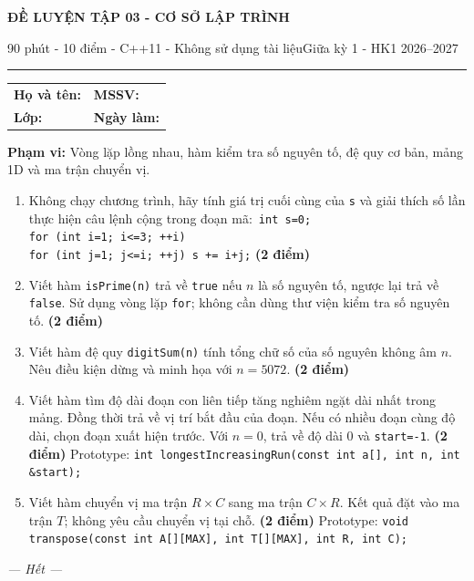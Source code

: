 \documentclass[11pt,a4paper]{article}
\newcommand{\examtitle}[4]{\begin{center}{\Large\bfseries\color{hcmusblue}#1}\par\vspace{3pt}{\large\bfseries #2}\par\vspace{3pt}\small #3\quad\textbullet\quad #4\end{center}\vspace{5pt}\hrule\vspace{8pt}}
\newcommand{\studentline}{\begin{tabularx}{\textwidth}{X X}\textbf{Họ và tên:} \hrulefill & \textbf{MSSV:} \hrulefill\\[7pt]\textbf{Lớp:} \hrulefill & \textbf{Ngày làm:} \hrulefill\end{tabularx}\vspace{8pt}}
\newcommand{\points}[1]{\hfill\textbf{(#1 điểm)}}
\begin{document}
\examtitle{ĐỀ LUYỆN TẬP 03 - CƠ SỞ LẬP TRÌNH}{CƠ SỞ LẬP TRÌNH - HCMUS (theo lịch học tuần 1--5)}{90 phút - 10 điểm - C++11 - Không sử dụng tài liệu}{Giữa kỳ 1 - HK1 2026--2027}

\studentline
\begin{notebox}\textbf{Phạm vi:} Vòng lặp lồng nhau, hàm kiểm tra số nguyên tố, đệ quy cơ bản, mảng 1D và ma trận chuyển vị.\end{notebox}
\begin{enumerate}
\item Không chạy chương trình, hãy tính giá trị cuối cùng của \texttt{s} và giải thích số lần thực hiện câu lệnh cộng trong đoạn mã:\
\texttt{int s=0;}\\
\texttt{for (int i=1; i<=3; ++i)}\\
\texttt{\quad for (int j=1; j<=i; ++j) s += i+j;} \points{2}
\item Viết hàm \texttt{isPrime(n)} trả về \texttt{true} nếu $n$ là số nguyên tố, ngược lại trả về \texttt{false}. Sử dụng vòng lặp \texttt{for}; không cần dùng thư viện kiểm tra số nguyên tố. \points{2}
\item Viết hàm đệ quy \texttt{digitSum(n)} tính tổng chữ số của số nguyên không âm $n$. Nêu điều kiện dừng và minh họa với $n=5072$. \points{2}
\item Viết hàm tìm độ dài đoạn con liên tiếp tăng nghiêm ngặt dài nhất trong mảng. Đồng thời trả về vị trí bắt đầu của đoạn. Nếu có nhiều đoạn cùng độ dài, chọn đoạn xuất hiện trước. Với $n=0$, trả về độ dài 0 và \texttt{start=-1}. \points{2}
Prototype: \texttt{int longestIncreasingRun(const int a[], int n, int \&start);}
\item Viết hàm chuyển vị ma trận $R\times C$ sang ma trận $C\times R$. Kết quả đặt vào ma trận $T$; không yêu cầu chuyển vị tại chỗ. \points{2}
Prototype: \texttt{void transpose(const int A[][MAX], int T[][MAX], int R, int C);}
\end{enumerate}
\vfill\begin{center}\textit{--- Hết ---}\end{center}
\end{document}
